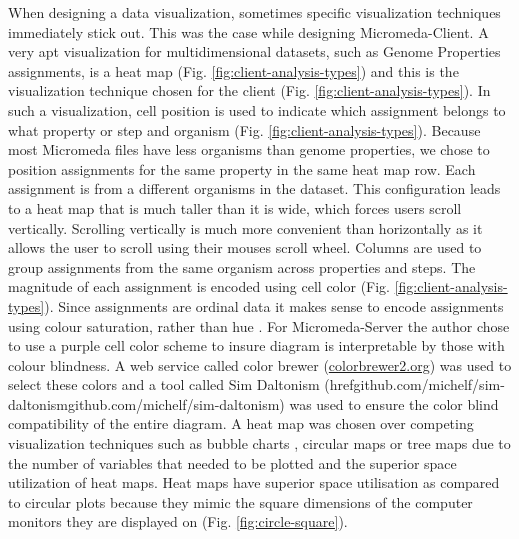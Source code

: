 When designing a data visualization, sometimes specific visualization techniques immediately stick out. This was the case while designing Micromeda-Client. A very apt visualization for multidimensional datasets, such as Genome Properties assignments, is a heat map \cite{wilkinson2009history,tufte2001visual}(Fig. \ref{fig:client-analysis-types}) and this is the visualization technique chosen for the client (Fig. \ref{fig:client-analysis-types}). In such a visualization, cell position is used to indicate which assignment belongs to what property or step and organism (Fig. \ref{fig:client-analysis-types}). Because most Micromeda files have less organisms than genome properties, we chose to position assignments for the same property in the same heat map row. Each assignment is from a different organisms in the dataset. This configuration leads to a heat map that is much taller than it is wide, which forces users scroll vertically. Scrolling vertically is much more convenient than horizontally as it allows the user to scroll using their mouses scroll wheel. Columns are used to group assignments from the same organism across properties and steps. The magnitude of each assignment is encoded using cell color (Fig. \ref{fig:client-analysis-types}). Since assignments are ordinal data it makes sense to encode assignments using colour saturation, rather than hue \cite{munzner2015visualization}. For Micromeda-Server the author chose to use a purple cell color scheme to insure diagram is interpretable by those with colour blindness. A web service called color brewer (\href{colorbrewer2.org}{colorbrewer2.org}) was used to select these colors and a tool called Sim Daltonism (href{github.com/michelf/sim-daltonism}{github.com/michelf/sim-daltonism}) was used to ensure the color blind compatibility of the entire diagram. A heat map was chosen over competing visualization techniques such as bubble charts \cite{tufte2001visual}, circular maps \cite{ward2002taxonomy,stothard2004circular} or tree maps \cite{techreport} due to the number of variables that needed to be plotted and the superior space utilization of heat maps. Heat maps have superior space utilisation as compared to circular plots because they mimic the square dimensions of the computer monitors they are displayed on (Fig. \ref{fig:circle-square}).

